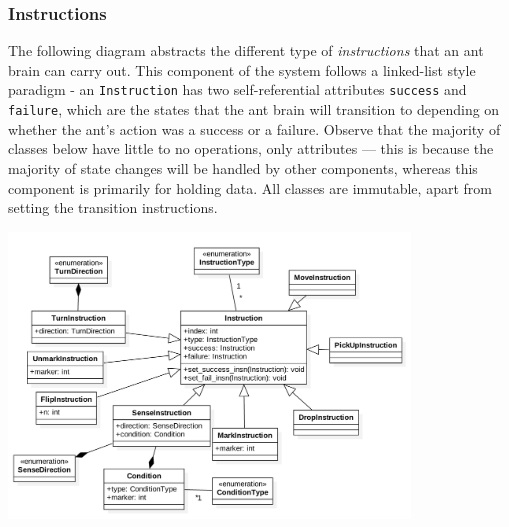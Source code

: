 \documentclass[11pt]{article}
\begin{document}
\subsubsection{Instructions}

The following diagram abstracts the different type of \textit{instructions} that an ant brain can carry out. This component of the system follows a linked-list style paradigm - an \texttt{Instruction} has two self-referential attributes \texttt{success} and \texttt{failure}, which are the states that the ant brain will transition to depending on whether the ant's action was a success or a failure. Observe that the majority of classes below have little to no operations, only attributes --- this is because the majority of state changes will be handled by other components, whereas this component is primarily for holding data. All classes are immutable, apart from setting the transition instructions.
 
\begin{center}
\includegraphics[width=0.8\textwidth]{low-level-diagrams/class/instruction.png}
\end{center}
\end{document}
